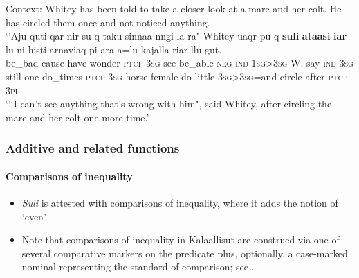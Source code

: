 \begin{exe}
	\ex\label{exAppendixGreenlandicIterativeIncrement}
	Context: Whitey has been told to take a closer look at a mare and her colt. He has circled them once and not noticed anything.\\
	\gll \lq\lq Aju-quti-qar-nir-su-q taku-sinnaa-nngi-la-ra" Whitey uaqr-pu-q \textbf{suli} \textbf{ataasi}-\textbf{iar}-lu-ni histi arnaviaq pi-ara-a=lu kajalla-riar-llu-gut.\\
	be\_bad-cause-have-wonder-\textsc{ptcp}-3\textsc{sg} see-be\_able-\textsc{neg}-\textsc{ind}-1\textsc{sg}>3\textsc{sg} W. say-\textsc{ind}-3\textsc{sg} still one-do\_times-\textsc{ptcp}-3\textsc{sg} horse female do-little-3\textsc{sg}>3\textsc{sg}=and circle-after-\textsc{ptcp}-3\textsc{pl}\\
	\glt \lq \lq\lq I can’t see anything that’s wrong with him", said Whitey, after circling the mare and her colt one more time.\rq{ }\parencite[Hesti piaraq tappiitsoq]{BittnerTexts}
\end{exe}


\subsubsection{Additive and related functions}

\paragraph{Comparisons of inequality}\label{appendixKalaallisutComparatives}
\begin{itemize}
	\item \textit{Suli} is attested with comparisons of inequality, where it adds the notion of \lq even\rq{}.
	\item Note that comparisons of inequality in Kalaallisut are construed via one of several comparative markers on the predicate plus, optionally, a case-marked nominal representing the standard of comparison; see \textcite[167–170]{Fortescue1984}.
\end{itemize}

